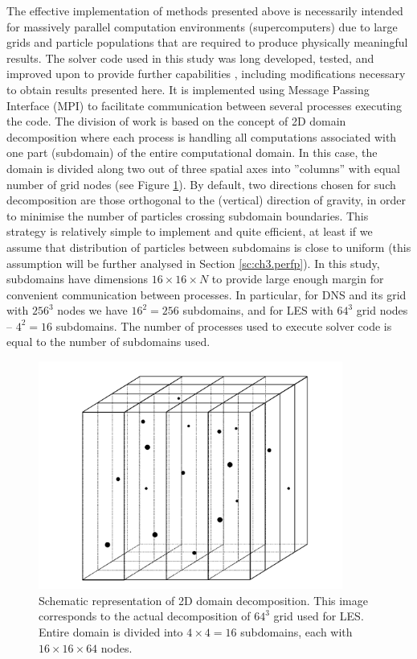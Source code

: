 \documentclass{pracamgren}
\begin{document}
The effective implementation of methods presented above is necessarily intended for massively parallel computation environments (supercomputers) due to large grids and particle populations that are required to produce physically meaningful results.
The solver code used in this study was long developed, tested, and improved upon to provide further capabilities \parencite[see~e.g.][]{Ayala2014,Parishani2015}, including modifications necessary to obtain results presented here.
It is implemented using Message Passing Interface (MPI) to facilitate communication between several processes executing the code.
The division of work is based on the concept of 2D domain decomposition where each process is handling all computations associated with one part (subdomain) of the entire computational domain.
In this case, the domain is divided along two out of three spatial axes into ''columns'' with equal number of grid nodes (see Figure \ref{fig:2dd}).
By default, two directions chosen for such decomposition are those orthogonal to the (vertical) direction of gravity, in order to minimise the number of particles crossing subdomain boundaries. 
This strategy is relatively simple to implement and quite efficient, at least if we assume that distribution of particles between subdomains is close to uniform (this assumption will be further analysed in Section \ref{sc:ch3.perfp}).
In this study, subdomains have dimensions $16 \times 16 \times N$ to provide large enough margin for convenient communication between processes.
In particular, for DNS and its grid with $256^{3}$ nodes we have $16^{2} = 256$ subdomains, and for LES with $64^{3}$ grid nodes -- $4^{2} = 16$ subdomains.
The number of processes used to execute solver code is equal to the number of subdomains used.

\begin{figure}[ht]
\centering
\includegraphics[width=10cm]{figures/1-04_2dd.pdf}
\caption{
Schematic representation of 2D domain decomposition.
This image corresponds to the actual decomposition of $64^{3}$ grid used for LES.
Entire domain is divided into $4 \times 4 = 16$ subdomains, each with $16 \times 16 \times 64$ nodes.
}
\label{fig:2dd}
\end{figure}
\end{document}
